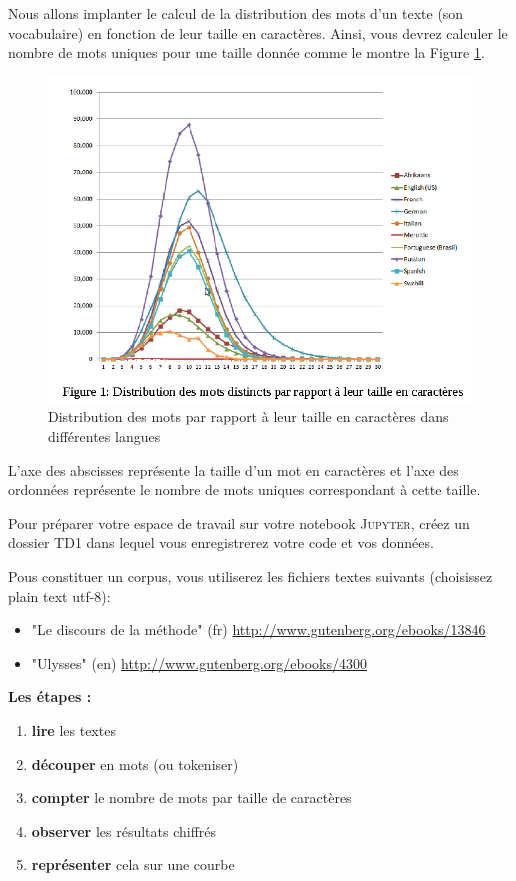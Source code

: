 
 Nous allons implanter le calcul de la distribution des mots d'un texte (son vocabulaire) en fonction de leur taille en caractères.
 Ainsi, vous devrez calculer le nombre de mots uniques pour une taille donnée comme le montre la Figure \ref{distrib}.

\begin{figure}[h]
  \includegraphics[trim = {0cm 1.5cm 0cm 0cm}, clip, width=.6\textwidth]{images/distrib.png}
  \caption{Distribution des mots par rapport à leur taille en caractères dans différentes langues\label{distrib}}
\end{figure}


 L'axe des abscisses représente la taille d'un mot en caractères et l'axe des ordonnées représente le nombre de mots uniques correspondant à cette taille.

Pour préparer votre espace de travail sur votre notebook  \textsc{Jupyter}, créez un dossier TD1 dans lequel vous enregistrerez votre code et vos données.

 Pous constituer un corpus, vous utiliserez les fichiers textes suivants (choisissez plain text utf-8):
\begin{itemize}
\item "Le discours de la méthode" (fr) \url{http://www.gutenberg.org/ebooks/13846} %
\item "Ulysses" (en) \url{http://www.gutenberg.org/ebooks/4300}
\end{itemize}

\newpage

\textbf{Les étapes :}

\begin{enumerate}
  \item  \textbf{lire} les textes
  \item  \textbf{découper} en mots (ou tokeniser)
  \item  \textbf{compter} le nombre de mots par taille de caractères
  \item  \textbf{observer} les résultats chiffrés
  \item  \textbf{représenter} cela sur une courbe
\end{enumerate}


